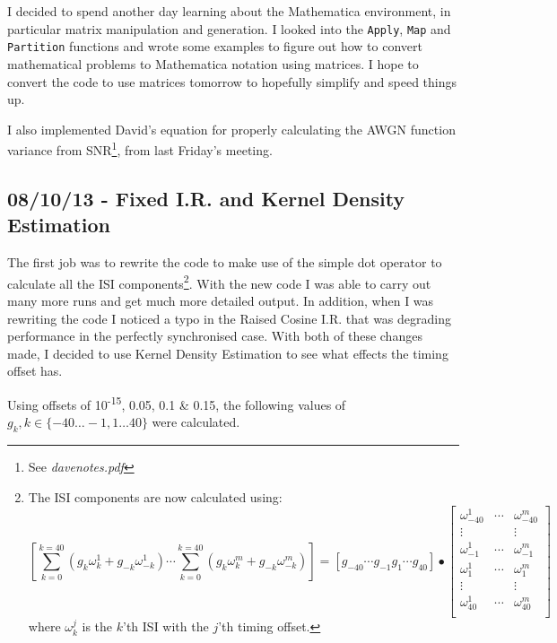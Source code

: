 I decided to spend another day learning about the Mathematica
environment, in particular matrix manipulation and generation. I looked
into the \texttt{Apply}, \texttt{Map} and \texttt{Partition} functions
and wrote some examples to figure out how to convert mathematical
problems to Mathematica notation using matrices. I hope to convert the
code to use matrices tomorrow to hopefully simplify and speed things up.

I also implemented David's equation for properly calculating the AWGN
function variance from SNR\footnote{See \emph{davenotes.pdf}}, from last
Friday's meeting.

\subsection{08/10/13 - Fixed I.R. and Kernel Density Estimation}

The first job was to rewrite the code to make use of the simple dot
operator to calculate all the ISI components\footnote{The ISI components
  are now calculated using: \[
  \left [
    \sum_{k=0}^{k=40} \left ( g_k \omega_k^1 + g_{-k} \omega_{-k}^1 \right ) \cdots \sum_{k=0}^{k=40} \left ( g_k \omega_k^m + g_{-k} \omega_{-k}^m \right )
  \right ] = \left [ 
    g_{-40} \cdots g_{-1} g_{1} \cdots g_{40}
  \right ] \bullet \left [
    \begin{matrix}
  \omega_{-40}^1 & \cdots & \omega_{-40}^m \\
  \vdots         &        & \vdots         \\
  \omega_{-1}^1  & \cdots & \omega_{-1}^m  \\
  \omega_{1}^1   & \cdots & \omega_{1}^m   \\
  \vdots         &        & \vdots         \\
  \omega_{40}^1  & \cdots & \omega_{40}^m  \\
    \end{matrix}
  \right ]
  \] where $\omega_{k}^j$ is the $k$'th ISI with the $j$'th timing
  offset.}. With the new code I was able to carry out many more runs and
get much more detailed output. In addition, when I was rewriting the
code I noticed a typo in the Raised Cosine I.R. that was degrading
performance in the perfectly synchronised case. With both of these
changes made, I decided to use Kernel Density Estimation to see what
effects the timing offset has.

Using offsets of 10\textsuperscript{-15}, 0.05, 0.1 \& 0.15, the
following values of $g_k, k \in \{ -40 \dots -1, 1 \dots 40 \}$ were
calculated.

